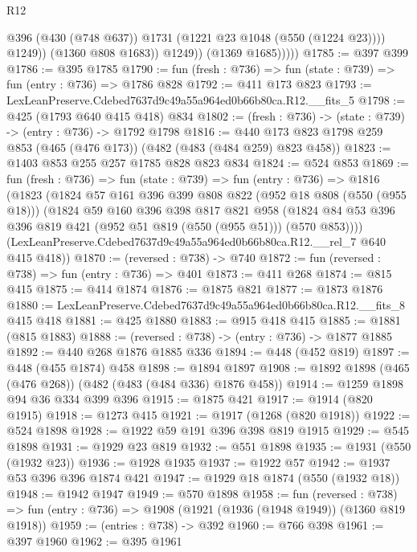 \begin{lexlean}{R12}
\begin{coremodule}
                        @396
                        (@430 (@748 @637))
                        @1731
                        (@1221 @23 @1048 (@550 (@1224 @23))))
                      @1249))
                  (@1360 @808 @1683))
                @1249))
            (@1369 @1685)))))
@1785 := @397 @399
@1786 := @395 @1785
@1790 := fun (fresh : @736) => fun (state : @739) => fun (entry : @736) => @1786 @828
@1792 := @411 @173 @823
@1793 := LexLeanPreserve.Cdebed7637d9c49a55a964ed0b66b80ca.R12.__fits_5
@1798 := @425 (@1793 @640 @415 @418) @834
@1802 := (fresh : @736) -> (state : @739) -> (entry : @736) -> @1792 @1798
@1816 := @440 @173 @823 @1798 @259 @853 (@465 (@476 @173)) (@482 (@483 (@484 @259) @823 @458))
@1823 := @1403 @853 @255 @257 @1785 @828 @823 @834
@1824 := @524 @853
@1869 := fun (fresh : @736) =>
  fun (state : @739) =>
  fun (entry : @736) =>
  @1816
    (@1823
      (@1824
        @57
        @161
        @396
        @399
        @808
        @822
        (@952 @18 @808 (@550 (@955 @18)))
        (@1824
          @59
          @160
          @396
          @398
          @817
          @821
          @958
          (@1824 @84 @53 @396 @396 @819 @421 (@952 @51 @819 (@550 (@955 @51))) (@570 @853))))
      (LexLeanPreserve.Cdebed7637d9c49a55a964ed0b66b80ca.R12.__rel_7 @640 @415 @418))
@1870 := (reversed : @738) -> @740
@1872 := fun (reversed : @738) => fun (entry : @736) => @401
@1873 := @411 @268
@1874 := @815 @415
@1875 := @414 @1874
@1876 := @1875 @821
@1877 := @1873 @1876
@1880 := LexLeanPreserve.Cdebed7637d9c49a55a964ed0b66b80ca.R12.__fits_8 @415 @418
@1881 := @425 @1880
@1883 := @915 @418 @415
@1885 := @1881 (@815 @1883)
@1888 := (reversed : @738) -> (entry : @736) -> @1877 @1885
@1892 := @440 @268 @1876 @1885 @336
@1894 := @448 (@452 @819)
@1897 := @448 (@455 @1874) @458
@1898 := @1894 @1897
@1908 := @1892 @1898 (@465 (@476 @268)) (@482 (@483 (@484 @336) @1876 @458))
@1914 := @1259 @1898 @94 @36 @334 @399 @396
@1915 := @1875 @421
@1917 := @1914 (@820 @1915)
@1918 := @1273 @415
@1921 := @1917 (@1268 (@820 @1918))
@1922 := @524 @1898
@1928 := @1922 @59 @191 @396 @398 @819 @1915
@1929 := @545 @1898
@1931 := @1929 @23 @819
@1932 := @551 @1898
@1935 := @1931 (@550 (@1932 @23))
@1936 := @1928 @1935
@1937 := @1922 @57
@1942 := @1937 @53 @396 @396 @1874 @421
@1947 := @1929 @18 @1874 (@550 (@1932 @18))
@1948 := @1942 @1947
@1949 := @570 @1898
@1958 := fun (reversed : @738) =>
  fun (entry : @736) => @1908 (@1921 (@1936 (@1948 @1949)) (@1360 @819 @1918))
@1959 := (entries : @738) -> @392
@1960 := @766 @398
@1961 := @397 @1960
@1962 := @395 @1961

\end{coremodule}
\end{lexlean}
